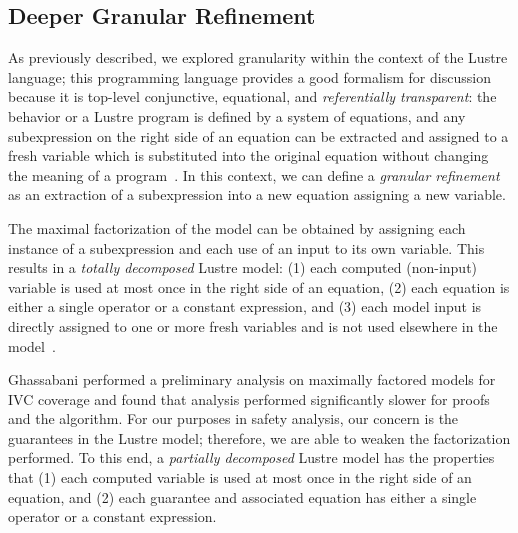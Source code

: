 \subsection{Deeper Granular Refinement}
\label{sec:granularityFRESHAlg}


As previously described, we explored granularity within the context of the Lustre language; this programming language provides a good formalism for discussion because it is top-level conjunctive, equational, and \emph{referentially transparent}: the behavior or a Lustre program is defined by a system of equations, and any subexpression on the right side of an equation can be extracted and assigned to a fresh variable which is substituted into the original equation without changing the meaning of a program~\cite{Halbwachs91:IEEE,ghassabani_2018}. In this context, we can define a \emph{granular refinement} as an extraction of a subexpression into a new equation assigning a new variable. 

The maximal factorization of the model can be obtained by assigning each instance of a subexpression and each use of an input to its own variable. This results in a \emph{totally decomposed} Lustre model: (1) each computed (non-input) variable is used at most once in the right side of an equation, (2) each equation is either a single operator or a constant expression, and (3) each model input is directly assigned to one or more fresh variables and is not used elsewhere in the model~\cite{ghassabani_2018}.

Ghassabani performed a preliminary analysis on maximally factored models for IVC coverage and found that analysis performed significantly slower for proofs and the \ivcmust algorithm. For our purposes in safety analysis, our concern is the guarantees in the Lustre model; therefore, we are able to weaken the factorization performed. To this end, a \emph{partially decomposed} Lustre model has the properties that (1) each computed variable is used at most once in the right side of an equation, and (2) each guarantee and associated equation has either a single operator or a constant expression. 










